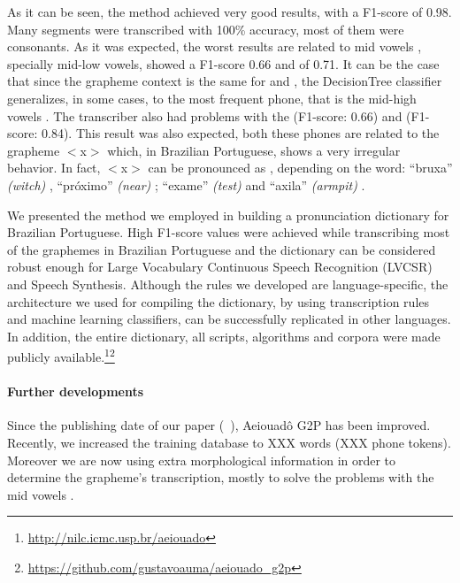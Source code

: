 As it can be seen, the method achieved very good results, with a F1-score of 0.98. Many segments were transcribed with 100\% accuracy, most of them were consonants. As it was expected, the worst results are related to mid vowels \textipa{[E, e, O, o]}, specially mid-low vowels, \textipa{[E]} showed a F1-score 0.66 and \textipa{[O]} of 0.71. It can be the case that since the grapheme context is the same for \textipa{[E, e]} and \textipa{[O, o]}, the DecisionTree classifier generalizes, in some cases, to the most frequent phone, that is the mid-high vowels \textipa{[e,o]}. The transcriber also had problems with the \textipa{[k.s]} (F1-score: 0.66) and \textipa{[S]} (F1-score: 0.84). This result was also expected, both these phones are related to the grapheme $<$x$>$ which, in Brazilian Portuguese, shows a very irregular behavior. In fact, $<$x$>$ can be pronounced as \textipa{[S, s, z, k.s]}, depending on the  word:  ``bruxa'' \emph{(witch)} \textipa{[S]}, ``pr\'oximo'' \emph{(near)} \textipa{[s]};  ``exame'' \emph{(test)} \textipa{[z]} and ``axila'' \emph{(armpit)} \textipa{[k.s]}.

We presented the method we employed in building a pronunciation dictionary for Brazilian Portuguese. High F1-score values were achieved while transcribing most of the graphemes in Brazilian Portuguese and the dictionary can be considered robust enough for Large Vocabulary Continuous Speech Recognition (LVCSR) and Speech Synthesis. Although the rules we developed are language-specific, the architecture we used for compiling the dictionary, by using transcription rules and machine learning classifiers, can be successfully replicated in other languages. In addition, the entire dictionary, all scripts, algorithms and corpora were made publicly available.\footnote{\url{http://nilc.icmc.usp.br/aeiouado}}\footnote{\url{https://github.com/gustavoauma/aeiouado_g2p}}

\clearpage

\paragraph{Further developments}

Since the publishing date of our paper (\citeauthor{Mendonca2014}~\cite{Mendonca2014}), Aeiouad\^o \ac{G2P} has been improved. Recently, we increased the training database to XXX words (XXX phone tokens). Moreover we are now using extra morphological information in order to determine the grapheme's transcription, mostly to solve the problems with the mid vowels \textipa{[E, e, O, o]}. 

